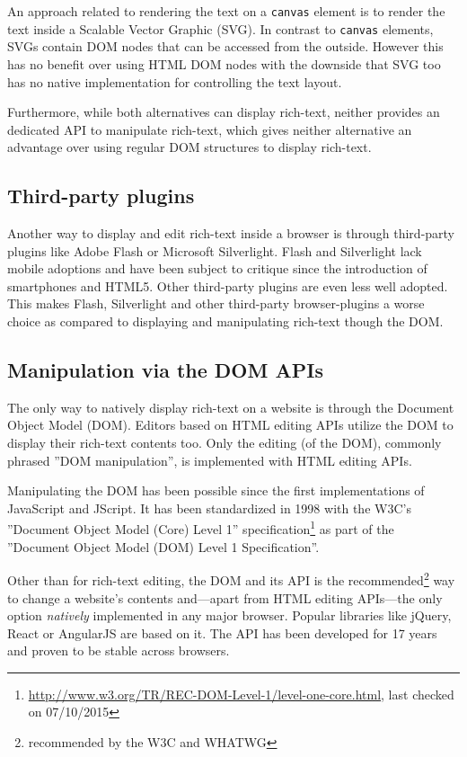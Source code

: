 An approach related to rendering the text on a \texttt{canvas} element is to render the text inside a Scalable Vector Graphic (SVG). In contrast to \texttt{canvas} elements, SVGs contain DOM nodes that can be accessed from the outside. However this has no benefit over using HTML DOM nodes with the downside that SVG too has no native implementation for controlling the text layout.

Furthermore, while both alternatives can display rich-text, neither provides an dedicated API to manipulate rich-text, which gives neither alternative an advantage over using regular DOM structures to display rich-text.

\subsection{Third-party plugins}

Another way to display and edit rich-text inside a browser is through third-party plugins like Adobe Flash or Microsoft Silverlight. Flash and Silverlight lack mobile adoptions and have been subject to critique since the introduction of smartphones and HTML5. Other third-party plugins are even less well adopted. This makes Flash, Silverlight and other third-party browser-plugins a worse choice as compared to displaying and manipulating rich-text though the DOM.

\subsection{Manipulation via the DOM APIs}
\label{subsec:manip_via_dom}

The only way to natively display rich-text on a website is through the Document Object Model (DOM). Editors based on HTML editing APIs utilize the DOM to display their rich-text contents too. Only the editing (of the DOM), commonly phrased ''DOM manipulation'', is implemented with HTML editing APIs.


Manipulating the DOM has been possible since the first implementations of JavaScript and JScript. It has been standardized in 1998 with the W3C's ''Document Object Model (Core) Level 1'' specification\footnote{\url{http://www.w3.org/TR/REC-DOM-Level-1/level-one-core.html}, last checked on 07/10/2015} as part of the ''Document Object Model (DOM) Level 1 Specification''.

Other than for rich-text editing, the DOM and its API is the recommended\footnote{recommended by the W3C and WHATWG} way to change a website's contents and---apart from HTML editing APIs---the only option \textit{natively} implemented in any major browser. Popular libraries like jQuery, React or AngularJS are based on it. The API has been developed for 17 years and proven to be stable across browsers. 

